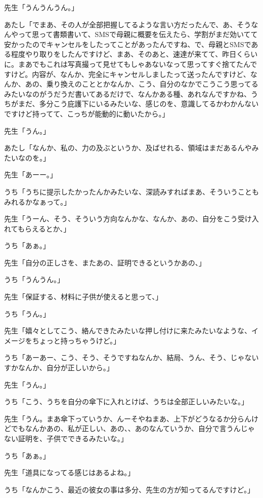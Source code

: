 \documentclass[b5j,twoside,twocolumn]{utarticle}
\begin{document}
\begin{description}
\item 先生「うんうんうん。」
\item あたし「でまあ、その人が全部把握してるような言い方だったんで、あ、そうなんやって思って書類書いて、SMSで母親に概要を伝えたら、学割がまだ効いてて安かったのでキャンセルをしたってことがあったんですね、で、母親とSMSである程度やり取りをしたんですけど、まあ、そのあと、速達が来てて、昨日くらいに。まあでもこれは写真撮って見せてもしゃあないなって思ってすぐ捨てたんですけど。内容が、なんか、完全にキャンセルしましたって送ったんですけど、なんか、あの、乗り換えのこととかなんか、こう、自分のなかでこうこう思ってるみたいなのがうだうだ書いてあるだけで、なんかある種、あれなんですかね、うちがまだ、多分こう庇護下にいるみたいな、感じのを、意識してるかわかんないですけど持ってて、こっちが能動的に動いたから。」
\item 先生「うん。」
\item あたし「なんか、私の、力の及ぶというか、及ばせれる、領域はまだあるんやみたいなのを。」
\item 先生「あーー。」
\item うち「うちに提示したかったんかみたいな、深読みすればまあ、そういうこともみれるかなぁって。」
\item 先生「うーん、そう、そういう方向なんかな、なんか、あの、自分をこう受け入れてもらえるとか、」
\item うち「あぁ。」
\item 先生「自分の正しさを、またあの、証明できるというかあの、」
\item うち「うんうん。」
\item 先生「保証する、材料に子供が使えると思って、」
\item うち「うん。」
\item 先生「嬉々としてこう、絡んできたみたいな押し付けに来たみたいなような、イメージをちょっと持っちゃうけど。」
\item うち「あーあー、こう、そう、そうですねなんか、結局、うん、そう、じゃないすかなんか、自分が正しいから。」
\item 先生「うん。」
\item うち「こう、うちを自分の傘下に入れとけば、うちは全部正しいみたいな。」
\item 先生「うん。まあ傘下っていうか、んーそやねまあ、上下がどうなるか分らんけどでもなんかあの、私が正しい、あの、、あのなんていうか、自分で言うんじゃない証明を、子供でできるみたいな。」
\item うち「あぁ。」
\item 先生「道具になってる感じはあるよね。」
\item うち「なんかこう、最近の彼女の事は多分、先生の方が知ってるんですけど。」

\end{description}
\end{document}
